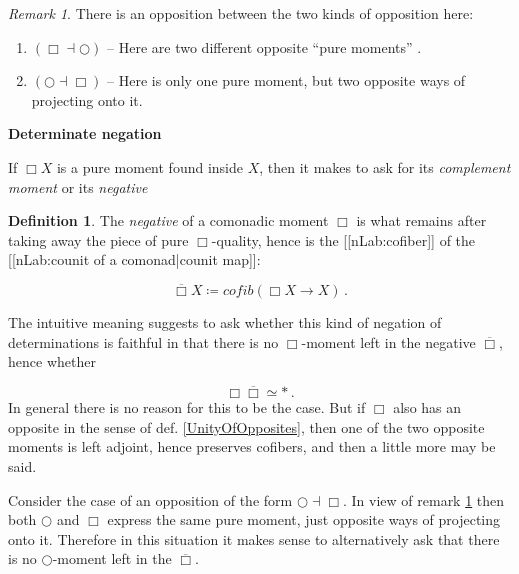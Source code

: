 \documentclass[12pt,titlepage]{article}
\theoremstyle{plain}
\theoremstyle{definition}
\newtheorem{defn}{Definition}
\theoremstyle{remark}
\newtheorem{remark}{Remark}
\begin{document}
\begin{remark}
\label{TheTwoKindsOfOpposites}\hypertarget{TheTwoKindsOfOpposites}{}
There is an opposition between the two kinds of opposition here:

\begin{enumerate}%
\item $(\Box \dashv \bigcirc)$ -- Here are two different opposite ``pure moments'' .


\item $(\bigcirc \dashv \Box)$ -- Here is only one pure moment, but two opposite ways of projecting onto it.



\end{enumerate}
\end{remark}
\textbf{Determinate negation}

If $\Box X$ is a pure moment found inside $X$, then it makes to ask for its \emph{complement moment} or its \emph{negative}

\begin{defn}
\label{NegativeMoment}\hypertarget{NegativeMoment}{}
The \emph{negative} of a comonadic moment $\Box$ is what remains after taking away the piece of pure $\Box$-quality, hence is the [[nLab:cofiber]] of the [[nLab:counit of a comonad|counit map]]:

\begin{displaymath}
\overline{\Box} X \coloneqq cofib(\Box X \to X)
  \,.
\end{displaymath}
\end{defn}
The intuitive meaning suggests to ask whether this kind of negation of determinations is faithful in that there is no $\Box$-moment left in the negative $\overline{\Box}$, hence whether

\begin{displaymath}
\Box \overline{\Box} \simeq \ast
  \,.
\end{displaymath}
In general there is no reason for this to be the case. But if $\Box$ also has an opposite in the sense of def. \ref{UnityOfOpposites}, then one of the two opposite moments is left adjoint, hence preserves cofibers, and then a little more may be said.

Consider the case of an opposition of the form $\bigcirc \dashv \Box$. In view of remark \ref{TheTwoKindsOfOpposites} then both $\bigcirc$ and $\Box$ express the same pure moment, just opposite ways of projecting onto it. Therefore in this situation it makes sense to alternatively ask that there is no $\bigcirc$-moment left in the $\overline{\Box}$.
\end{document}

